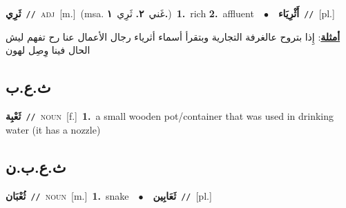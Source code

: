 \documentclass[10pt,a4paper,twoside]{article} %
\begin{document}
\begin{multicols}{2}
{\setlength\topsep{0pt}\textbf{\foreignlanguage{arabic}{ثَرِي}}\ {\color{gray}\texttt{//}\color{black}}\ \textsc{adj}\ [m.]\ \color{gray}(msa. \foreignlanguage{arabic}{غَني}~\foreignlanguage{arabic}{\textbf{٢.}}  \foreignlanguage{arabic}{ثَرِي}~\foreignlanguage{arabic}{\textbf{١.}})\color{black}\ \textbf{1.}~rich  \textbf{2.}~affluent\ \ $\bullet$\ \ \setlength\topsep{0pt}\textbf{\foreignlanguage{arabic}{أَثْرِيَاء}}\ {\color{gray}\texttt{//}\color{black}}\ [pl.]\  \begin{flushright}\color{gray}\foreignlanguage{arabic}{\textbf{\underline{\foreignlanguage{arabic}{أمثلة}}}: إِذا بتروح عالغرفة التجارية وبتقرأ أسماء أثرياء رجال الأعمال عنا رح تفهم ليش الحال فينا وِصِل لهون}\end{flushright}\color{black}} \vspace{2mm}

\vspace{-3mm}
\subsection*{\color{blue}\foreignlanguage{arabic}{ث.ع.ب}\color{blue}{}} 

{\setlength\topsep{0pt}\textbf{\foreignlanguage{arabic}{ثَعْبِة}}\ {\color{gray}\texttt{//}\color{black}}\ \textsc{noun}\ [f.]\ \textbf{1.}~a small wooden pot/container that was used in drinking water (it has a nozzle)\ } \vspace{2mm}

\vspace{-3mm}
\subsection*{\color{blue}\foreignlanguage{arabic}{ث.ع.ب.ن}\color{blue}{ (ntws)}} 

{\setlength\topsep{0pt}\textbf{\foreignlanguage{arabic}{ثُعْبَان}}\ {\color{gray}\texttt{//}\color{black}}\ \textsc{noun}\ [m.]\ \textbf{1.}~snake\ \ $\bullet$\ \ \setlength\topsep{0pt}\textbf{\foreignlanguage{arabic}{ثَعَابِين}}\ {\color{gray}\texttt{//}\color{black}}\ [pl.]\ } \vspace{2mm}


\end{multicols}
\end{document}

